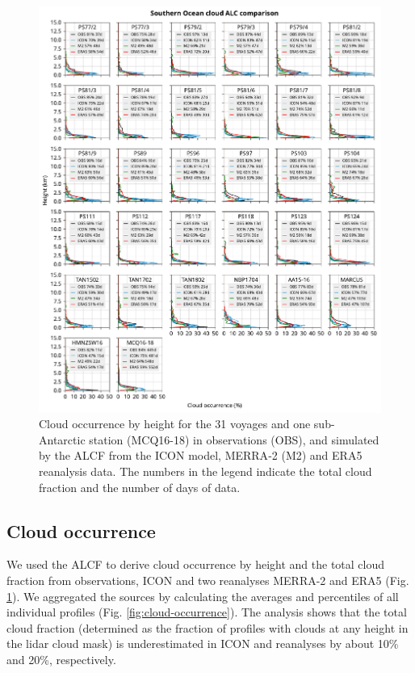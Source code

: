 \documentclass[12pt,a4paper]{article}
\begin{document}
\begin{figure}
\centerline{
\includegraphics[width=1.06\textwidth]{img/cloud_occurrence_panel.pdf}
}
\caption{Cloud occurrence by height for the 31 voyages and one sub-Antarctic
station (MCQ16-18) in observations (OBS), and simulated by the ALCF from the
ICON model, MERRA‐2 (M2) and ERA5 reanalysis data. The numbers in the legend
indicate the total cloud fraction and the number of days of data.}
\label{fig:cloud-occurrence-panel}
\end{figure}

\subsection{Cloud occurrence}

We used the ALCF to derive cloud occurrence by height and the total cloud
fraction from observations, ICON and two reanalyses MERRA-2 and ERA5 (Fig.
\ref{fig:cloud-occurrence-panel}). We aggregated the sources by calculating
the averages and percentiles of all individual profiles (Fig.
\ref{fig:cloud-occurrence}). The analysis shows that the total cloud fraction
(determined as the fraction of proﬁles with clouds at any height in the lidar
cloud mask) is underestimated in ICON and reanalyses by about 10\% and 20\%,
respectively.
\end{document}
